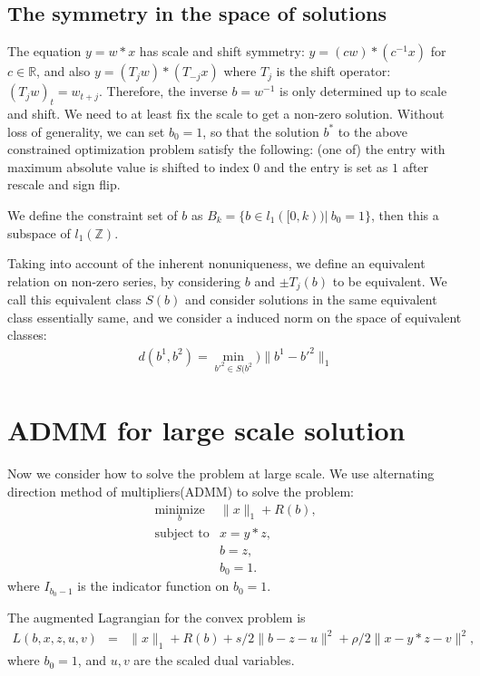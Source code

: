 \documentclass[letter, 10pt]{article}
\numberwithin{equation}{section}
\begin{document}
\subsection{The symmetry in the space of solutions }
The equation $y = w * x$ has scale and shift symmetry:
$y = (cw) *(c^{-1}x)$ for $c\in \mathbb{R}$, and also $y = (T_jw) *(T_{-j}x)$ where $T_j$ is the shift operator: $(T_jw)_t = w_{t+j}$.  Therefore, the inverse $b = w^{-1}$ is only determined up to scale and shift. We need to at least fix the scale to get a non-zero solution. Without loss of generality, we can set $b_0 =1$, so that the solution $b^*$ to the above constrained optimization problem satisfy the following: (one of) the entry with maximum absolute value is shifted to index $0$ and the entry is set as $1$ after rescale and sign flip. 

We define the constraint set of $b$ as $B_{k} = \{b\in l_1( [0, k)) |\  b_0 =1\}$, then this a subspace of  $l_1( \mathbb{Z})$.

Taking into account of the inherent nonuniqueness, we define an equivalent relation on non-zero series, by considering $b$ and $\pm T_j(b) $ to be equivalent. We call this equivalent class $S(b)$ and consider solutions in the same equivalent class essentially same, and we consider a induced norm on the space of equivalent classes:
 \begin{eqnarray*}
d(b^1, b^2) = \min_{b'^2 \in S({b^2}}) \|b^1 - b'^2\|_1
 \end{eqnarray*}
 
 
 

 
\section{ADMM for large scale solution}
Now we consider how to solve the problem at large scale.
We use alternating direction method of multipliers(ADMM) to solve the problem:
 \begin{eqnarray*}
\underset{b}{\mbox{minimize}}& \|x\|_1 + R(b),\\
\mbox{subject to}& x = y*z, \\
& b = z, \\
& b_0 =1.
 \end{eqnarray*}
 where $I_{b_0-1}$ is the indicator function on $b_0 =1.$
 
 The augmented Lagrangian for the convex problem is 
\begin{eqnarray*}
 L(b, x , z, u, v)&=&\|x\|_1 + R(b) +s/2 \| b-z-u\|^2 +
 \rho /2 \| x-y*z-v\|^2,
\end{eqnarray*}
where $ b_0 =1$, and $u, v$ are the scaled dual variables.  
\end{document}
